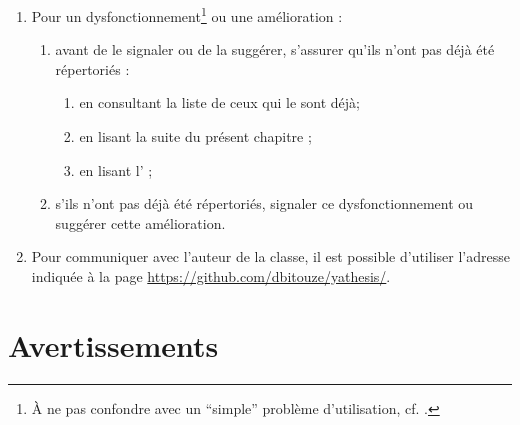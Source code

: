 \begin{enumerate}
\item Pour un dysfonctionnement\footnote{À ne pas confondre avec un
    \enquote{simple} problème d'utilisation,
    cf. .}  ou une amélioration :
  \begin{enumerate}
  \item avant de le signaler ou de la suggérer, s'assurer qu'ils n'ont pas déjà
    été répertoriés :
    \begin{enumerate}
    \item en consultant la liste de ceux qui le sont déjà\issues ;
    \item en lisant la suite du présent chapitre ;
    \item en lisant l' ;
    \end{enumerate}
  \item s'ils n'ont pas déjà été répertoriés, signaler ce
    dysfonctionnement\ecm{} ou suggérer cette amélioration\newissues{}.
  \end{enumerate}
\item Pour communiquer avec l'auteur de la classe, il est possible d'utiliser
  l'adresse indiquée à la page \url{https://github.com/dbitouze/yathesis/}.
\end{enumerate}

\section{Avertissements}
\label{sec-avertissements}

